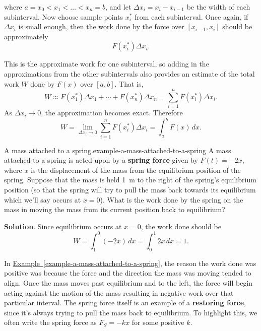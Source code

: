 \documentclass[10pt,]{book}
\newcommand{\terminology}[1]{\textbf{#1}}
\numberwithin{equation}{section}
\newcommand{\lt}{<}
\begin{document}
where \(a = x_{0} \lt x_{1} \lt \ldots \lt x_{n} = b\), and let \(\Delta x_{i} = x_{i} - x_{i-1}\) be the width of each subinterval. Now choose sample points \(x_{i}^{*}\) from each subinterval. Once again, if \(\Delta x_{i}\) is small enough, then the work done by the force over \([x_{i-1}, x_{i}]\) should be approximately%
\begin{equation*}
F(x_{i}^{*})\Delta x_{i}.
\end{equation*}
%
\par
\hypertarget{p-684}{}%
This is the approximate work for one subinterval, so adding in the approximations from the other subintervals also provides an estimate of the total work \(W\) done by \(F(x)\) over \([a,b]\). That is,%
\begin{equation*}
W \approx F(x_{1}^{*})\Delta x_{1} + \cdots + F(x_{n}^{*})\Delta x_{n} = \sum_{i=1}^{n}F(x_{i}^{*})\Delta x_{i}.
\end{equation*}
As \(\Delta x_{i}\to 0\), the approximation becomes exact. Therefore%
\begin{equation}
W = \lim_{\Delta x_{i}\to 0}\sum_{i=1}^{n}F(x_{i}^{*})\Delta x_{i} = \int_{a}^{b}F(x)\,dx.\label{equation-work-integral}
\end{equation}
%
\begin{example}{A mass attached to a spring.}{example-a-mass-attached-to-a-spring}%
\hypertarget{p-685}{}%
A mass attached to a spring is acted upon by a \terminology{spring force} given by \(F(t) = -2x\), where \(x\) is the displacement of the mass from the equilibrium position of the spring. Suppose that the mass is held \SI{1}{\meter} to the right of the spring's equilibrium position (so that the spring will try to pull the mass back towards its equilibrium which we'll say occurs at \(x = 0\)). What is the work done by the spring on the mass in moving the mass from its current position back to equilibrium?%
\par\smallskip%
\noindent\textbf{Solution}.\hypertarget{solution-149}{}\quad%
\hypertarget{p-686}{}%
Since equilibrium occurs at \(x = 0\), the work done should be%
\begin{equation*}
W = \int_{1}^{0}(-2x)\,dx = \int_{0}^{1}2x\,dx = 1.
\end{equation*}
%
\end{example}
\hypertarget{p-687}{}%
In \hyperref[example-a-mass-attached-to-a-spring]{Example~\ref{example-a-mass-attached-to-a-spring}}, the reason the work done was positive was because the force and the direction the mass was moving tended to align. Once the mass moves past equilibrium and to the left, the force will begin acting against the motion of the mass resulting in negative work over that particular interval. The spring force itself is an example of a \terminology{restoring force}, since it's always trying to pull the mass back to equilibrium. To highlight this, we often write the spring force as \(F_{S} = -kx\) for some positive \(k\).%
%
%
\typeout{************************************************}
\typeout{************************************************}
%
\end{document}
